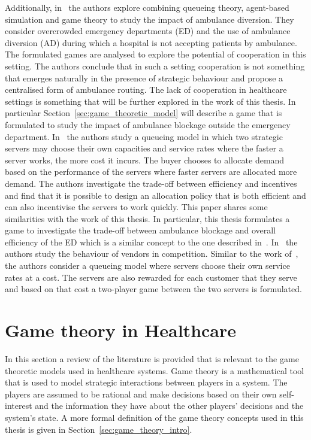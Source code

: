 Additionally, in~\cite{hagtvedt2009cooperative} the authors explore combining
queueing theory, agent-based simulation and game theory to study the impact of
ambulance diversion.
They consider overcrowded emergency departments (ED) and the use of ambulance
diversion (AD) during which a hospital is not accepting patients by ambulance.
The formulated games are analysed to explore the potential of cooperation
in this setting.
The authors conclude that in such a setting cooperation is not something that
emerges naturally in the presence of strategic behaviour and propose a
centralised form of ambulance routing.
The lack of cooperation in healthcare settings is something that will be
further explored in the work of this thesis.
In particular Section~\ref{sec:game_theoretic_model} will describe a game
that is formulated to study the impact of ambulance blockage outside the
emergency department.
In~\cite{cachon2007obtaining} the authors study a queueing model in which two
strategic servers may choose their own capacities and service rates where
the faster a server works, the more cost it incurs.
The buyer chooses to allocate demand based on the performance of the servers
where faster servers are allocated more demand.
The authors investigate the trade-off between efficiency and incentives and
find that it is possible to design an allocation policy that is both efficient
and can also incentivise the servers to work quickly.
This paper shares some similarities with the work of this thesis.
In particular, this thesis formulates a game to investigate the trade-off
between ambulance blockage and overall efficiency of the ED which is a similar
concept to the one described in~\cite{cachon2007obtaining}.
In~\cite{kalai1992optimal} the authors study the behaviour of vendors in
competition.
Similar to the work of~\cite{cachon2007obtaining}, the authors consider a
queueing model where servers choose their own service rates at a cost.
The servers are also rewarded for each customer that they serve and
based on that cost a two-player game between the two servers is formulated.



\section{Game theory in Healthcare}
\label{sec:lit_review_game_theory_in_healthcare}

In this section a review of the literature is provided that is relevant to the
game theoretic models used in healthcare systems.
Game theory is a mathematical tool that is used to model strategic interactions
between players in a system.
The players are assumed to be rational and make decisions based on their own
self-interest and the information they have about the other players' decisions
and the system's state.
A more formal definition of the game theory concepts used in this thesis is
given in Section~\ref{sec:game_theory_intro}.

